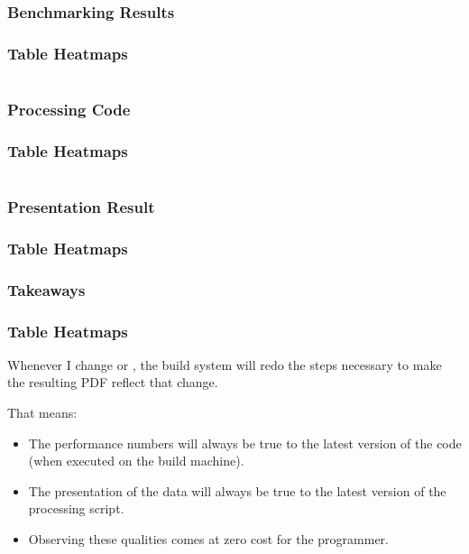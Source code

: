 {\subsubsection{Benchmarking Results}
\begin{frame}[fragile]
  \frametitle{Table Heatmaps }
  \vspace{-1mm}
  \inputminted[fontsize=\footnotesize]{text}{../src/table_heatmap/code.txt}
\end{frame}

\subsubsection{Processing Code}
\begin{frame}[fragile]
  \frametitle{Table Heatmaps }
  \vspace{-5mm}
  \begin{multicols}{2}
    \inputminted[fontsize=\tiny,breaklines]{python}{../src/table_heatmap/process.py}
  \end{multicols}
\end{frame}

\subsubsection{Presentation Result}
\begin{frame}[fragile]
  \frametitle{Table Heatmaps }
  \vspace{24mm}
  \scalebox{0.9}{
    
  }
\end{frame}

\subsubsection{Takeaways}
\begin{frame}[fragile]
  \frametitle{Table Heatmaps }
  \vspace{3mm}
  Whenever I change  or , the build system will redo the steps necessary to make the resulting PDF reflect that change.
  
  \pause
  \vspace{5mm}
  That means:
  \begin{itemize}
    \item The performance numbers will always be true to the latest version of the code (when executed on the build machine).
    \item The presentation of the data will always be true to the latest version of the processing script.
    \item Observing these qualities comes at zero cost for the programmer.
  \end{itemize}
\end{frame}

}
